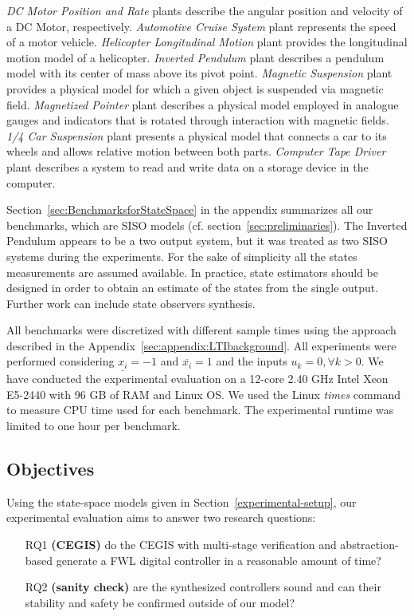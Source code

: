 \documentclass[runningheads,a4paper]{llncs}
\begin{document}
\textit{DC Motor Position and Rate} plants describe the angular position and 
velocity of a DC Motor, respectively. 
\textit{Automotive Cruise System} plant represents the speed of a motor vehicle. 
\textit{Helicopter Longitudinal Motion} plant provides the longitudinal motion model 
of a helicopter. 
\textit{Inverted Pendulum} plant describes a pendulum model
with its center of mass above its pivot point. 
\textit{Magnetic Suspension} plant provides a physical model for which 
a given object is suspended via magnetic field. 
\textit{Magnetized Pointer} plant describes a physical model employed in analogue gauges 
and indicators that is rotated through interaction with magnetic fields.
\textit{1/4 Car Suspension} plant presents a physical model that connects a car to its wheels 
and allows relative motion between both parts.
\textit{Computer Tape Driver} plant describes a system to read and write data 
on a storage device in the computer.

Section~\ref{sec:BenchmarksforStateSpace} in the appendix summarizes 
all our benchmarks, which are SISO models (cf. section~\ref{sec:preliminaries}). 
The Inverted Pendulum appears to be a two output system, but it was treated as two 
SISO systems during the experiments. For the sake of simplicity all the states 
measurements are assumed available. In practice, state estimators should be designed 
in order to obtain an estimate of the states from the single output. 
Further work can include 
state observers synthesis.

All benchmarks were discretized with different sample times using 
the approach described in the Appendix~\ref{sec:appendix:LTIbackground}. 
All experiments were performed considering $\underline{x_{i}}=-1$ and 
$\overline{x_{i}}=1$ and the inputs $u_{k}=0, \forall k>0$.
We have conducted the experimental evaluation on a 12-core 2.40 GHz
Intel Xeon E5-2440 with 96 GB of RAM and Linux OS. We used the Linux \emph{times} command
to measure CPU time used for each benchmark. The experimental runtime was limited to
one hour per benchmark.
%

\subsection{Objectives}

Using the state-space models given in Section~\ref{experimental-setup}, 
our experimental evaluation aims to answer two research questions:
%
\begin{enumerate}

\item[RQ1] \textbf{(CEGIS)} do the CEGIS with multi-stage 
verification and abstraction-based generate a FWL digital 
controller in a reasonable amount of time?

\item[RQ2] \textbf{(sanity check)} are the synthesized controllers sound
and can their stability and safety be confirmed outside of our model?

\end{enumerate}
\end{document}
